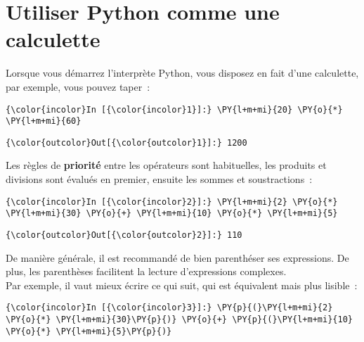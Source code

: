     \hypertarget{utiliser-python-comme-une-calculette}{%
\section{Utiliser Python comme une
calculette}\label{utiliser-python-comme-une-calculette}}

    Lorsque vous démarrez l'interprète Python, vous disposez en fait d'une
calculette, par exemple, vous pouvez taper~:

    \begin{Verbatim}[commandchars=\\\{\}]
{\color{incolor}In [{\color{incolor}1}]:} \PY{l+m+mi}{20} \PY{o}{*} \PY{l+m+mi}{60}
\end{Verbatim}


\begin{Verbatim}[commandchars=\\\{\}]
{\color{outcolor}Out[{\color{outcolor}1}]:} 1200
\end{Verbatim}
            
    Les règles de \textbf{priorité} entre les opérateurs sont habituelles,
les produits et divisions sont évalués en premier, ensuite les sommes et
soustractions~:

    \begin{Verbatim}[commandchars=\\\{\}]
{\color{incolor}In [{\color{incolor}2}]:} \PY{l+m+mi}{2} \PY{o}{*} \PY{l+m+mi}{30} \PY{o}{+} \PY{l+m+mi}{10} \PY{o}{*} \PY{l+m+mi}{5}
\end{Verbatim}


\begin{Verbatim}[commandchars=\\\{\}]
{\color{outcolor}Out[{\color{outcolor}2}]:} 110
\end{Verbatim}
            
    De manière générale, il est recommandé de bien parenthéser ses
expressions. De plus, les parenthèses facilitent la lecture
d'expressions complexes.\\

Par exemple, il vaut mieux écrire ce qui suit, qui est équivalent mais
plus lisible~:

    \begin{Verbatim}[commandchars=\\\{\}]
{\color{incolor}In [{\color{incolor}3}]:} \PY{p}{(}\PY{l+m+mi}{2} \PY{o}{*} \PY{l+m+mi}{30}\PY{p}{)} \PY{o}{+} \PY{p}{(}\PY{l+m+mi}{10} \PY{o}{*} \PY{l+m+mi}{5}\PY{p}{)}
\end{Verbatim}


